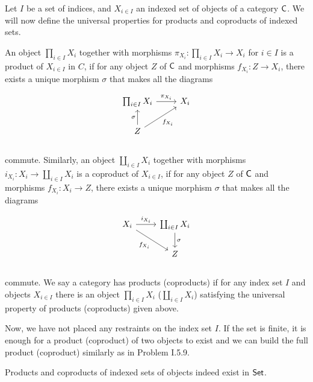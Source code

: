 \begin{solution}
	Let $I$ be a set of indices, and $X_{i \in I}$ an indexed set of objects of a category $\mathsf{C}$. We will now define the universal properties for products and coproducts of indexed sets.
	
	An object $\prod_{i \in I} X_i$ together with morphisms $\pi_{X_i}: \prod_{i \in I} X_i \to X_i$ for $i \in I$ is a product of $X_{i \in I}$ in $C$, if for any object $Z$ of $\mathsf{C}$ and morphisms $f_{X_i}: Z \to X_i$, there exists a unique morphism $\sigma$ that makes all the diagrams
	
	\begin{equation*}
		\begin{tikzcd}[row sep=small]
			\prod_{i \in I} X_i 
			\arrow[r, "\pi_{X_i}"] 
			& X_i \\
			& \\
			Z 
			\arrow[uur, "f_{X_i}"']
			\arrow[uu, "\sigma"]
			& \\
		\end{tikzcd}
	\end{equation*}
	
	commute. Similarly, an object $\coprod_{i \in I} X_i$ together with morphisms $i_{X_i}: X_i \to \coprod_{i \in I} X_i$ is a coproduct of $X_{i \in I}$, if for any object $Z$ of $\mathsf{C}$ and morphisms $f_{X_i}: X_i \to Z$, there exists a unique morphism $\sigma$ that makes all the diagrams
	
	\begin{equation*}
		\begin{tikzcd}[row sep=small]
			X_i
			\arrow[r, "i_{X_i}"]
			\arrow[ddr, "f_{X_i}"']
			& \coprod_{i \in I} X_i 
			\arrow[dd, "\sigma"] \\
			\\
			&
			Z \\
		\end{tikzcd}
	\end{equation*}
	
	commute. We say a category has products (coproducts) if for any index set $I$ and objects $X_{i \in I}$ there is an object $\prod_{i \in I} X_i$ ($\coprod_{i \in I} X_i$) satisfying the universal property of products (coproducts) given above.
	
	Now, we have not placed any restraints on the index set $I$. If the set is finite, it is enough for a product (coproduct) of two objects to exist and we can build the full product (coproduct) similarly as in Problem I.5.9.
	
	Products and coproducts of indexed sets of objects indeed exist in $\mathsf{Set}$.
	
\end{solution}


